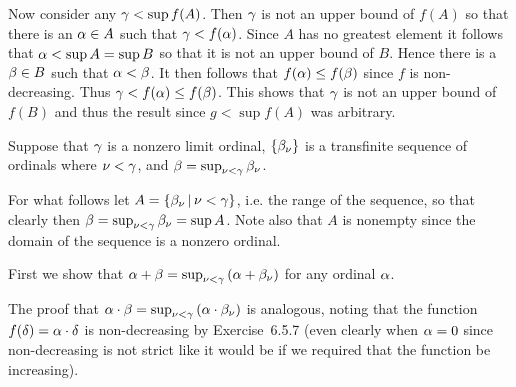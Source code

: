 \begin{questions}
{{    Now consider any $\gamma < \sup{f(A)}$.
    Then $\gamma$ is not an upper bound of $f(A)$ so that there is an $\alpha \in A$ such that $\gamma < f(\alpha)$.
    Since $A$ has no greatest element it follows that $\alpha < \sup{A} = \sup{B}$ so that it is not an upper bound of $B$.
    Hence there is a $\beta \in B$ such that $\alpha < \beta$.
    It then follows that $f(\alpha) \leq f(\beta)$ since $f$ is non-decreasing.
    Thus $\gamma < f(\alpha) \leq f(\beta)$.
    This shows that $\gamma$ is not an upper bound of $f(B)$ and thus the result since $g < \sup{f(A)}$ was arbitrary.
  }

  \mainthrm

  Suppose that $\gamma$ is a nonzero limit ordinal, $\left\{ \beta_\nu \right\}$ is a transfinite sequence of ordinals where $\nu < \gamma$, and $\beta = \sup_{\nu < \gamma} \beta_\nu$.

  For what follows let $A = \left\{ \beta_\nu \,|\, \nu < \gamma \right\}$, i.e. the range of the sequence, so that clearly then $\beta = \sup_{\nu < \gamma} \beta_\nu = \sup{A}$.
  Note also that $A$ is nonempty since the domain of the sequence is a nonzero ordinal.

  First we show that $\alpha + \beta = \sup_{\nu < \gamma} \left( \alpha + \beta_\nu \right)$ for any ordinal $\alpha$.

  The proof that $\alpha \cdot \beta = \sup_{\nu < \gamma} \left( \alpha \cdot \beta_\nu \right)$ is analogous, noting that the function $f(\delta) = \alpha \cdot \delta$ is non-decreasing by Exercise~6.5.7 (even clearly when $\alpha = 0$ since non-decreasing is not strict like it would be if we required that the function be increasing).

}
\end{questions}
